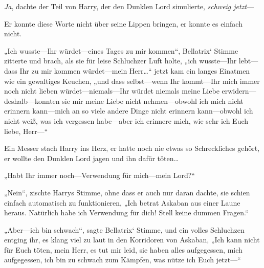 \emph{Ja}, dachte der Teil von Harry, der den Dunklen Lord simulierte, \emph{schweig jetzt}—

Er konnte diese Worte nicht über seine Lippen bringen, er konnte es einfach nicht.

„Ich wusste—Ihr würdet—eines Tages zu mir kommen“, Bellatrix‘ Stimme zitterte und brach, als sie für leise Schluchzer Luft holte, „ich wusste—Ihr lebt—dass Ihr zu mir kommen würdet—mein Herr…“ jetzt kam ein langes Einatmen wie ein gewaltiges Keuchen, „und dass selbst—wenn Ihr kommt—Ihr mich immer noch nicht lieben würdet—niemals—Ihr würdet niemals meine Liebe erwidern—deshalb—konnten sie mir meine Liebe nicht nehmen—obwohl ich mich nicht erinnern kann—mich an so viele andere Dinge nicht erinnern kann—obwohl ich nicht weiß, was ich vergessen habe—aber ich erinnere mich, wie sehr ich Euch liebe, Herr—“

Ein Messer stach Harry ins Herz, er hatte noch nie etwas so Schreckliches gehört, er wollte den Dunklen Lord jagen und ihn dafür töten…

„Habt Ihr immer noch—Verwendung für mich—mein Lord?“

„Nein“, zischte Harrys Stimme, ohne dass er auch nur daran dachte, sie schien einfach automatisch zu funktionieren, „Ich betrat Askaban aus einer Laune heraus. Natürlich habe ich Verwendung für dich! Stell keine dummen Fragen.“

„Aber—ich bin schwach“, sagte Bellatrix‘ Stimme, und ein volles Schluchzen entging ihr, es klang viel zu laut in den Korridoren von Askaban, „Ich kann nicht für Euch töten, mein Herr, es tut mir leid, sie haben alles aufgegessen, mich aufgegessen, ich bin zu schwach zum Kämpfen, was nütze ich Euch jetzt—“

